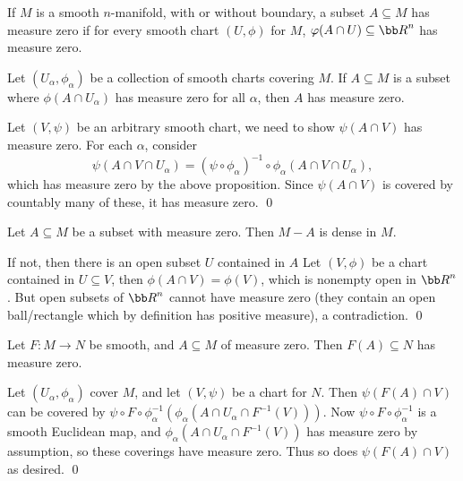 \enote

\bdefn

    If $M$ is a smooth $n$-manifold, with or without boundary, a subset $A\subseteq M$ has {\emphcolor measure zero} if for every smooth chart
    $(U,\phi)$ for $M$, $\phi(A\cap U)\subseteq\bR^n$ has measure zero.

\edefn

\blemm

    Let $(U_\alpha,\phi_\alpha)$ be a collection of smooth charts covering $M$.
    If $A\subseteq M$ is a subset where $\phi(A\cap U_\alpha)$ has measure zero for all $\alpha$, then $A$ has measure zero.

\elemm

\bproof

    Let $(V,\psi)$ be an arbitrary smooth chart, we need to show $\psi(A\cap V)$ has measure zero.
    For each $\alpha$, consider
    $$ \psi(A\cap V\cap U_\alpha) = (\psi\circ\phi_\alpha)^{-1}\circ\phi_\alpha(A\cap V\cap U_\alpha) , $$
    which has measure zero by the above proposition.
    Since $\psi(A\cap V)$ is covered by countably many of these, it has measure zero.
    \qed

\eproof

\bprop

    Let $A\subseteq M$ be a subset with measure zero.
    Then $M-A$ is dense in $M$.

\eprop

\bproof

    If not, then there is an open subset $U$ contained in $A$
    Let $(V,\phi)$ be a chart contained in $U\subseteq V$, then $\phi(A\cap V)=\phi(V)$, which is nonempty open in $\bR^n$.
    But open subsets of $\bR^n$ cannot have measure zero (they contain an open ball/rectangle which by definition has positive measure),
    a contradiction.
    \qed

\eproof

\bthrm

    Let $F\colon M\to N$ be smooth, and $A\subseteq M$ of measure zero.
    Then $F(A)\subseteq N$ has measure zero.

\ethrm

\bproof

    Let $(U_\alpha,\phi_\alpha)$ cover $M$, and let $(V,\psi)$ be a chart for $N$.
    Then $\psi(F(A)\cap V)$ can be covered by $\psi\circ F\circ\phi_\alpha^{-1}(\phi_\alpha(A\cap U_\alpha\cap F^{-1}(V)))$.
    Now $\psi\circ F\circ\phi_\alpha^{-1}$ is a smooth Euclidean map, and $\phi_\alpha(A\cap U_\alpha\cap F^{-1}(V))$ has measure zero by assumption,
    so these coverings have measure zero.
    Thus so does $\psi(F(A)\cap V)$ as desired.
    \qed


